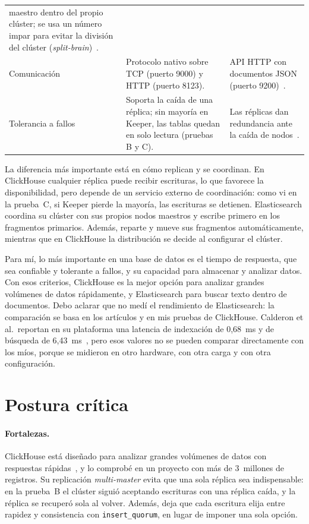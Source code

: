 \documentclass[12pt,a4paper]{article}
\begin{document}
\begin{table}[htbp]
\begin{tabularx}{\linewidth}{@{}>{\raggedright\arraybackslash}p{2.6cm} X X@{}}
      maestro dentro del propio clúster; se usa un número impar para
      evitar la división del clúster (\emph{split-brain})~\cite[p.~2380]{calderon2024}. \\
    Comunicación & Protocolo nativo sobre TCP (puerto 9000) y HTTP (puerto
      8123). & API HTTP con documentos JSON (puerto
      9200)~\cite[p.~4]{haugerud2022}. \\
    Tolerancia a fallos & Soporta la caída de una réplica; sin mayoría en
      Keeper, las tablas quedan en solo lectura (pruebas B y C). & Las
      réplicas dan redundancia ante la caída de
      nodos~\cite[p.~2377]{calderon2024}. \\
    \bottomrule
  \end{tabularx}
\end{table}

La diferencia más importante está en cómo replican y se coordinan. En
ClickHouse cualquier réplica puede recibir escrituras, lo que favorece
la disponibilidad, pero depende de un servicio externo de coordinación:
como vi en la prueba~C, si Keeper pierde la mayoría, las escrituras se
detienen. Elasticsearch coordina su clúster con sus propios nodos
maestros y escribe primero en los fragmentos primarios. Además, reparte
y mueve sus fragmentos automáticamente, mientras que en ClickHouse la
distribución se decide al configurar el clúster.

Para mí, lo más importante en una base de datos es el tiempo de
respuesta, que sea confiable y tolerante a fallos, y su capacidad para
almacenar y analizar datos. Con esos criterios, ClickHouse es la mejor
opción para analizar grandes volúmenes de datos rápidamente, y
Elasticsearch para buscar texto dentro de documentos. Debo aclarar que
no medí el rendimiento de Elasticsearch: la comparación se basa en los
artículos y en mis pruebas de ClickHouse. Calderon et al.\ reportan en
su plataforma una latencia de indexación de 0,68~ms y de búsqueda de
6,43~ms~\cite[p.~2383]{calderon2024}, pero esos valores no se pueden
comparar directamente con los míos, porque se midieron en otro hardware,
con otra carga y con otra configuración.

\section{Postura crítica}

\paragraph{Fortalezas.} ClickHouse está diseñado para analizar grandes
volúmenes de datos con respuestas rápidas~\cite{schulze2024}, y lo
comprobé en un proyecto con más de 3~millones de registros. Su
replicación \emph{multi-master} evita que una sola réplica sea
indispensable: en la prueba~B el clúster siguió aceptando escrituras con
una réplica caída, y la réplica se recuperó sola al volver. Además, deja
que cada escritura elija entre rapidez y consistencia con
\texttt{insert\_quorum}, en lugar de imponer una sola opción.
\end{document}
